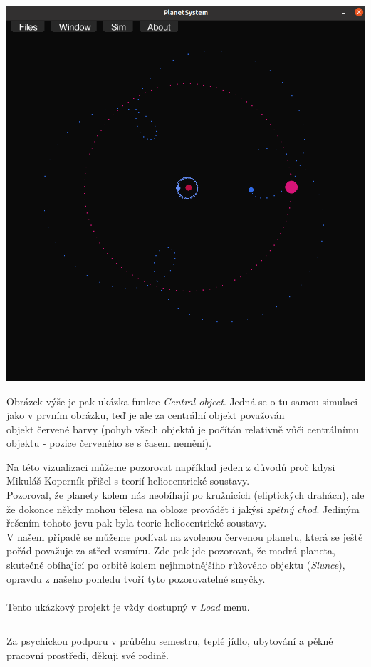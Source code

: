 \documentclass[a4paper, 12pt]{article}
\begin{document}
\begin{center}
\includegraphics[width=0.9\linewidth]{pics/p5_crop.png}
\end{center}

Obrázek výše je pak ukázka funkce \emph{Central object}. Jedná se o tu
samou simulaci jako v prvním obrázku, teď je ale za centrální objekt považován
\\objekt červené barvy (pohyb všech objektů je počítán relativně vůči centrálnímu
objektu - pozice červeného se s časem nemění).

Na této vizualizaci můžeme pozorovat například jeden z důvodů proč kdysi
Mikuláš Koperník přišel s teorií heliocentrické soustavy. \\Pozoroval, že
planety kolem nás neobíhají po kružnicích (eliptických drahách), ale že dokonce
někdy mohou tělesa na obloze provádět i jakýsi \emph{zpětný chod}. Jediným
řešením tohoto jevu pak byla teorie heliocentrické soustavy.  \\V našem případě
se můžeme podívat na zvolenou červenou planetu, která se ještě pořád považuje
za střed vesmíru. Zde pak jde pozorovat, že modrá planeta, skutečně obíhající
po orbitě kolem nejhmotnějšího růžového objektu (\emph{Slunce}), opravdu z
našeho pohledu tvoří tyto pozorovatelné smyčky.
\\\\
\footnotesize Tento ukázkový projekt je vždy dostupný v \emph{Load} menu.\\
\rule{\linewidth}{1pt}
\newpage

\normalsize
Za psychickou podporu v průběhu semestru, teplé jídlo, ubytování a pěkné pracovní
prostředí, děkuji své rodině.
\end{document}
